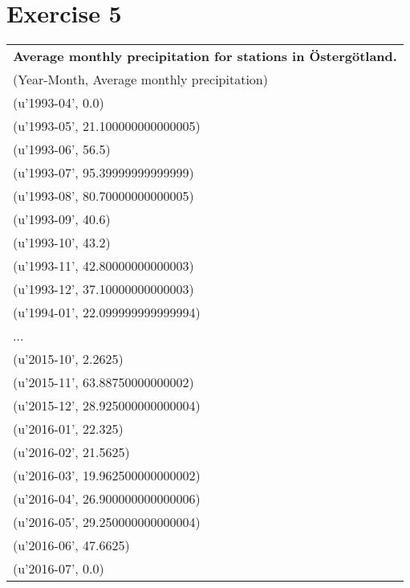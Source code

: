 \documentclass[a4paper,titlepage,12pt]{article}
\begin{document}
\section{Exercise 5}
\begin{tabular}{l}
  \bf Average monthly precipitation for stations in Östergötland. \\ 
  (Year-Month, Average monthly precipitation) \\
  \hline
  (u'1993-04', 0.0)               \\ 
  (u'1993-05', 21.100000000000005)\\ 
  (u'1993-06', 56.5)              \\
  (u'1993-07', 95.39999999999999) \\
  (u'1993-08', 80.70000000000005) \\
  (u'1993-09', 40.6)              \\
  (u'1993-10', 43.2)              \\
  (u'1993-11', 42.80000000000003) \\
  (u'1993-12', 37.10000000000003) \\
  (u'1994-01', 22.099999999999994)\\
  ... \\
  (u'2015-10', 2.2625)            \\
  (u'2015-11', 63.88750000000002) \\
  (u'2015-12', 28.925000000000004)\\
  (u'2016-01', 22.325)            \\
  (u'2016-02', 21.5625)           \\
  (u'2016-03', 19.962500000000002)\\
  (u'2016-04', 26.900000000000006)\\
  (u'2016-05', 29.250000000000004)\\
  (u'2016-06', 47.6625)           \\
  (u'2016-07', 0.0)               \\
\end{tabular}
\end{document}
